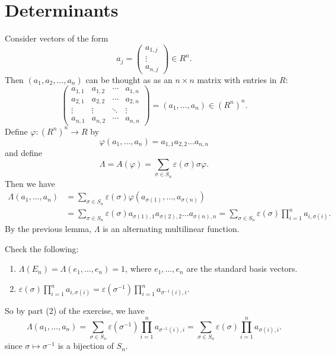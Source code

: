 \section{Determinants}
Consider vectors of the form
\[
  a_j =
  \begin{pmatrix}
    a_{1, j} \\
    \vdots \\
    a_{n, j}
  \end{pmatrix} \in R^n.
\]
Then $(a_1, a_2, \dots, a_n)$ can be thought as
as an $n \times n$ matrix with entries in $R$:
\[
  \begin{pmatrix}
    a_{1, 1} & a_{1, 2} & \cdots & a_{1, n} \\
    a_{2, 1} & a_{2, 2} & \cdots & a_{2, n}\\
    \vdots & \vdots & \ddots & \vdots \\
    a_{n, 1} & a_{n, 2} & \cdots & a_{n, n}
  \end{pmatrix}
  = (a_1, \dots, a_n) \in (R^n)^n.
\]
Define $\varphi : (R^n)^n \to R$ by
\[
  \varphi(a_1, \dots, a_n) = a_{1, 1} a_{2, 2} \dots a_{n, n}
\]
and define
\[
  \Lambda = A(\varphi) = \sum_{\sigma \in S_n} \varepsilon(\sigma) \sigma \varphi.
\]
Then we have
\begin{align*}
  \Lambda(a_1, \dots, a_n)
  &= \sum_{\sigma \in S_n} \varepsilon(\sigma) \varphi(a_{\sigma(1)}, \dots, a_{\sigma(n)}) \\
  &= \sum_{\sigma \in S_n} \varepsilon(\sigma) a_{\sigma(1), 1} a_{\sigma(2), 2} \dots a_{\sigma(n), n}
  = \sum_{\sigma \in S_n} \varepsilon(\sigma) \prod_{i = 1}^n a_{i, \sigma(i)}.
\end{align*}
By the previous lemma,
$\Lambda$ is an alternating multilinear function.

\begin{exercise}
  Check the following:
  \begin{enumerate}
    \item $\Lambda(E_n) = \Lambda(e_1, \dots, e_n) = 1$,
      where $e_1, \dots, e_n$ are the standard basis
      vectors.
    \item $\displaystyle \varepsilon(\sigma) \prod_{i = 1}^n a_{i, \sigma(i)} = \varepsilon(\sigma^{-1}) \prod_{i = 1}^n a_{\sigma^{-1}(i), i}$.
  \end{enumerate}
\end{exercise}

So by part (2) of the exercise, we have
\[
  \Lambda(a_1, \dots, a_n) = \sum_{\sigma \in S_n} \varepsilon(\sigma^{-1}) \prod_{i = 1}^n a_{\sigma^{-1}(i), i}
  = \sum_{\sigma \in S_n} \varepsilon(\sigma) \prod_{i = 1}^n a_{\sigma(i), i}.
\]
since $\sigma \mapsto \sigma^{-1}$ is a bijection of $S_n$.

